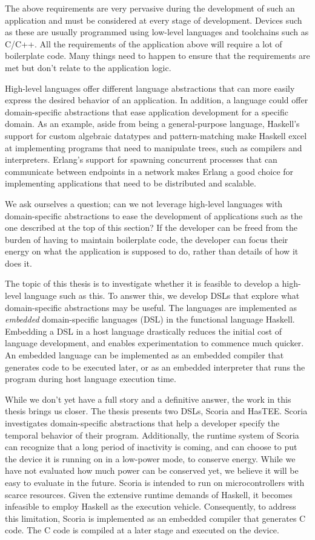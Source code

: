 The above requirements are very pervasive during the development of such an application and must be considered at every stage of
development. Devices such as these are usually programmed using low-level languages and toolchains such as C/C++. All the
requirements of the application above will require a lot of boilerplate code. Many things need to
happen to ensure that the requirements are met but don't relate to the application logic.

High-level languages offer different language abstractions that can more easily express the desired behavior of an application.
In addition, a language could offer domain-specific abstractions that ease application development for a specific domain.
As an example, aside from being a general-purpose language, Haskell's support for custom algebraic datatypes and pattern-matching
make Haskell excel at implementing programs that need to manipulate trees, such as compilers and interpreters. Erlang's support
for spawning concurrent processes that can communicate between endpoints in a network makes Erlang a good choice for implementing
applications that need to be distributed and scalable.

We ask ourselves a question; can we not leverage high-level languages with domain-specific abstractions to ease the
development of applications such as the one described at the top of this section? If the developer can be freed from the burden
of having to maintain boilerplate code, the developer can focus their energy on what the application is supposed to do, rather than
details of how it does it.

The topic of this thesis is to investigate whether it is feasible to develop a high-level language such as this. To
answer this, we develop DSLs that explore what domain-specific abstractions may be useful. The languages are
implemented as \textit{embedded} domain-specific languages (DSL) in the functional language Haskell. Embedding a DSL in a host
language drastically reduces the initial cost of language development, and enables experimentation to commence much quicker. An
embedded language can be implemented as an embedded compiler that generates code to be executed later, or as an embedded
interpreter that runs the program during host language execution time.

While we don't yet have a full story and a definitive answer, the work in this thesis brings us closer.
The thesis presents two DSLs, Scoria and HasTEE. Scoria investigates domain-specific
abstractions that help a developer specify the temporal behavior of their program. Additionally, the runtime system of Scoria can
recognize that a long period of inactivity is coming, and can choose to put the device it is running on in a low-power mode,
to conserve energy. While we have not evaluated how much power can be conserved yet, we believe it will be easy to evaluate
in the future. Scoria is intended to run on microcontrollers with scarce resources. Given the extensive runtime demands
of Haskell, it becomes infeasible to employ Haskell as the execution vehicle. Consequently, to address this limitation, Scoria
is implemented as an embedded compiler that generates C code. The C code is compiled at a later stage and executed on the device.

